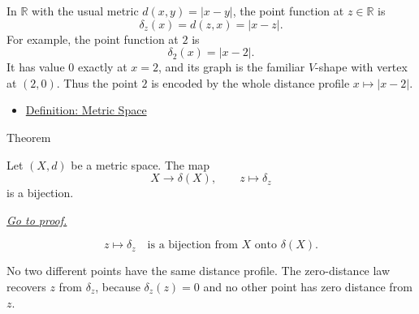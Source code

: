 \begin{remark*}[Examples]
In \(\mathbb{R}\) with the usual metric \(d(x,y)=|x-y|\), the point function
at \(z\in\mathbb{R}\) is
\[
  \delta_z(x)=d(z,x)=|x-z|.
\]
For example, the point function at \(2\) is
\[
  \delta_2(x)=|x-2|.
\]
It has value \(0\) exactly at \(x=2\), and its graph is the familiar
\(V\)-shape with vertex at \((2,0)\).  Thus the point \(2\) is encoded by the
whole distance profile \(x\mapsto |x-2|\).
\end{remark*}

\begin{dependencies}
\begin{itemize}
  \item \hyperref[def:metric-space]{Definition: Metric Space}
\end{itemize}
\end{dependencies}

\begin{theorembox}{Theorem}
\begin{theorem}
\label{thm:metric-point-functions-identify-points}
Let \((X,d)\) be a metric space.  The map
\[
  X\to\delta(X),
  \qquad
  z\mapsto\delta_z
\]
is a bijection.

\smallskip
\noindent
\hyperref[prf:metric-point-functions-identify-points]{\textit{Go to proof.}}
\end{theorem}
\end{theorembox}

\begin{remark*}
\[
z\mapsto\delta_z
\quad\text{is a bijection from }X\text{ onto }\delta(X).
\]
\end{remark*}

\begin{remark*}[Interpretation]
No two different points have the same distance profile.  The zero-distance
law recovers \(z\) from \(\delta_z\), because \(\delta_z(z)=0\) and no other
point has zero distance from \(z\).
\end{remark*}

